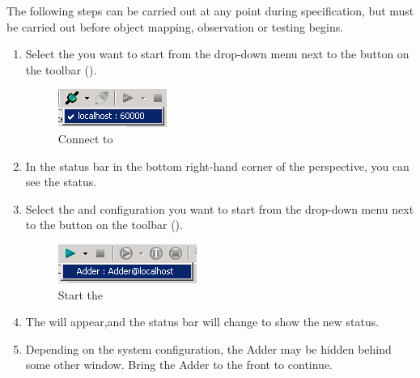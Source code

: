The following steps can be carried out at any point during specification, 
 but must be carried out before object mapping, observation or testing begins. 

\begin{enumerate}
\item Select the \gdserver you want to start from the drop-down menu next to the   button on the toolbar (). 
\begin{figure}[h]
\begin{center}
\includegraphics{Tutorials/PS/TutConnectServer}
\caption{Connect to \gdserver}
\label{TutConnectServer}
\end{center}
\end{figure}

\item In the status bar in the bottom right-hand corner of the perspective, you can see the \gdserver status. 
\item Select the \gdaut{} and configuration you want to start from the drop-down menu next to the   button on the toolbar ().
\begin{figure}[h]
\begin{center}
\includegraphics{Tutorials/PS/TutStartAUT}
\caption{Start the \gdaut{}}
\label{TutStartAUT}
\end{center}
\end{figure}

\item The \gdaut{} will appear,and the  status 
bar will change to show the new status. 
\item Depending on the system 
configuration, the Adder may be hidden behind some other window. Bring the 
Adder to the front to continue. 
\end{enumerate}
